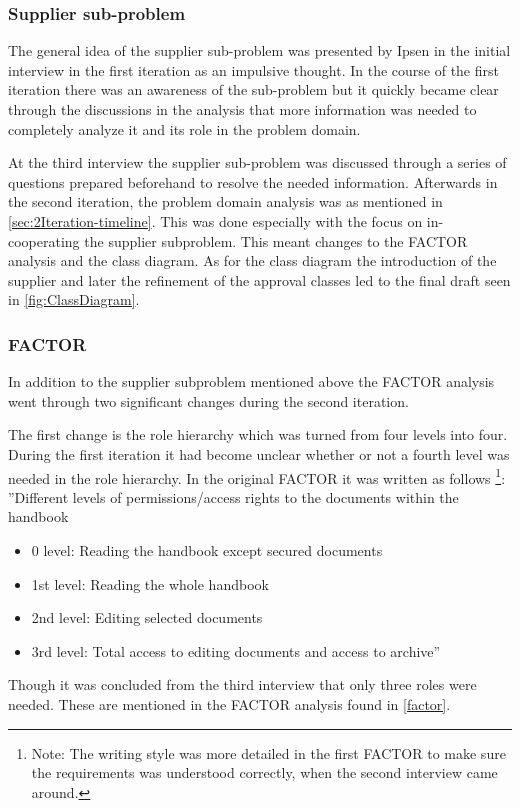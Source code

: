 \subsubsection*{Supplier sub-problem} 
The general idea of the supplier sub-problem was presented by Ipsen in the initial interview in the first iteration as an impulsive thought.
In the course of the first iteration there was an awareness of the sub-problem but it quickly became clear through the discussions in the analysis that more information was needed to completely analyze it and its role in the problem domain.

At the third interview the supplier sub-problem was discussed through a series of questions prepared beforehand to resolve the needed information.
Afterwards in the second iteration, the problem domain analysis was as mentioned in \cref{sec:2Iteration-timeline}. 
This was done especially with the focus on in-cooperating the supplier subproblem.
This meant changes to the FACTOR analysis and the class diagram.
As for the class diagram the introduction of the supplier and later the refinement of the approval classes led to the final draft seen in \cref{fig:ClassDiagram}.

\subsubsection*{FACTOR}
In addition to the supplier subproblem mentioned above the FACTOR analysis went through two significant changes during the second iteration.

The first change is the role hierarchy which was turned from four levels into four. 
During the first iteration it had become unclear whether or not a fourth level was needed in the role hierarchy.
In the original FACTOR it was written as follows
\footnote{Note: The writing style was more detailed in the first FACTOR to make sure the requirements was understood correctly, when the second interview came around.}:
\newline
''Different levels of permissions/access rights to the documents within the handbook
\begin{itemize}
	\item 
	0 level:
	Reading the handbook except secured documents
	\item 
	1st level:
	Reading the whole handbook
	\item 
	2nd level:
	Editing selected documents
	\item 
	3rd level:
	Total access to editing documents and access to archive''
\end{itemize}
Though it was concluded from the third interview that only three roles were needed.
These are mentioned in the FACTOR analysis found in \cref{factor}.

